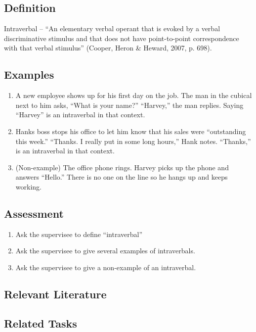 \subsection{Definition} 
Intraverbal – ``An elementary verbal operant that is evoked by a verbal discriminative stimulus and that does not have point-to-point correspondence with that verbal stimulus'' (Cooper, Heron \& Heward, 2007, p. 698).
%
\subsection{Examples}
\begin{enumerate}
\item A new employee shows up for his first day on the job. The man in the cubical next to him asks, ``What is your name?''  ``Harvey,'' the man replies. Saying ``Harvey'' is an intraverbal in that context.
\item Hanks boss stops his office to let him know that his sales were ``outstanding this week.''  ``Thanks. I really put in some long hours,'' Hank notes.  ``Thanks,'' is an intraverbal in that context.
\item (Non-example) The office phone rings. Harvey picks up the phone and answers ``Hello.'' There is no one on the line so he hangs up and keeps working. 
%
\end{enumerate}
%
\subsection{Assessment}
\begin{enumerate}
\item Ask the supervisee to define ``intraverbal''  
\item Ask the supervisee to give several examples of intraverbals.
\item Ask the supervisee to give a non-example of an intraverbal.
%
\end{enumerate}
%
\subsection{Relevant Literature}
\begin{refsection}
\nocite{cooper2007applied,
        partington1993teaching,
        skinner1957verbal}
\printbibliography[heading=none]
\end{refsection}
%
\subsection{Related Tasks}
\fourdThirteen{}\\
